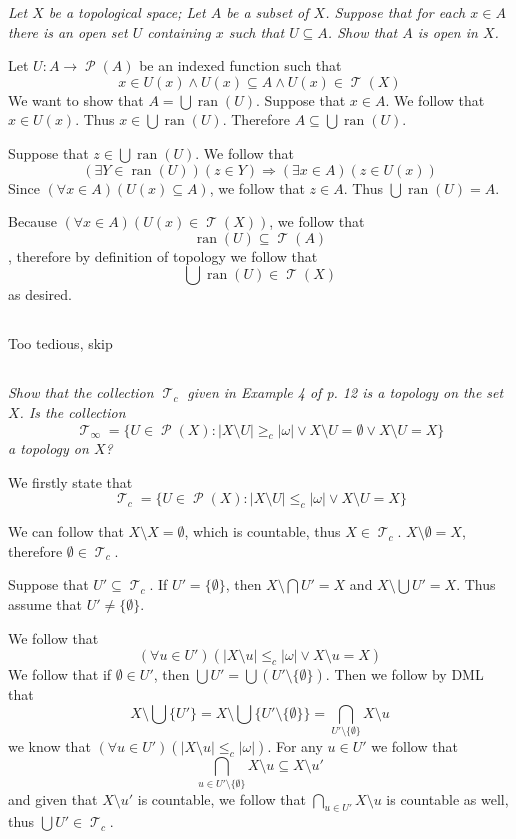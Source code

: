 \documentclass[11pt,oneside,titlepage]{book}
\DeclareMathOperator \pow {\mathcal {P}}
\DeclareMathOperator \topol {\mathcal {T}}
\DeclareMathOperator \ra {\Rightarrow}
\DeclareMathOperator \ran {ran}
\begin{document}
\textit{Let $X$ be a topological space; Let $A$ be a subset of $X$. Suppose that for each
  $x \in A$ there is an open set $U$ containing $x$ such that $U \subseteq A$. Show that $A$ is
  open in $X$.}

Let $U: A \to \pow(A)$ be an indexed function such that 
$$x \in U(x) \land U(x) \subseteq A \land U(x) \in \topol(X)$$
We want to show that $A = \bigcup{\ran(U)}$. Suppose that $x \in A$. We follow that
$x \in U(x)$. Thus $x \in \bigcup{\ran(U)}$. Therefore $A \subseteq \bigcup{\ran(U)}$.

Suppose that $z \in \bigcup{\ran(U)}$. We follow that
$$(\exists Y \in \ran(U))(z \in Y) \ra
(\exists x \in A)(z \in U(x))$$
Since $(\forall x \in A)(U(x) \subseteq A)$, we follow that $z \in A$. Thus
$\bigcup{\ran(U)} = A$.

Because $(\forall x \in A)(U(x) \in \topol(X))$, we follow that
$$\ran(U) \subseteq \topol(A)$$, therefore by definition of topology we follow that
$$\bigcup{\ran(U)} \in \topol(X)$$
as desired.

\subsection{}

Too tedious, skip

\subsection{}

\textit{Show that the collection $\topol_c$ given in Example 4 of p. 12 is a topology on the
  set $X$. Is the collection
  $$\topol_\infty = \{U \in \pow(X):
  |X \setminus U| \geq_c |\omega| \lor X \setminus U = \emptyset \lor
  X \setminus U = X\}$$
  a topology on $X$?
}

We firstly state that
$$\topol_c = \{U \in \pow(X): |X \setminus U| \leq_c |\omega| \lor X \setminus U = X\}$$

We can follow that $X \setminus X = \emptyset$, which is countable, thus $X \in \topol_c$.
$X \setminus \emptyset = X$, therefore $\emptyset \in \topol_c$.

Suppose that $U' \subseteq \topol_c$. If $U' = \{\emptyset\}$, then $
X \setminus \bigcap{U'} = X$ and $X \setminus \bigcup{U'} = X$.
Thus assume that $U' \neq \{\emptyset\}$.

We follow that
$$(\forall u \in U')(|X \setminus u| \leq_c |\omega| \lor X \setminus u = X)$$
We follow that if $\emptyset \in U'$, then $\bigcup{U'} = \bigcup{(U' \setminus \{\emptyset\})}$.
Then we follow by DML that
$$X \setminus \bigcup\{U'\} = X \setminus \bigcup\{U' \setminus \{\emptyset\}\} =
\bigcap_{U' \setminus \{\emptyset\}}{X \setminus u}$$
we know that $(\forall u \in U')(|X \setminus u| \leq_c |\omega|)$. For any $u \in U'$ we
follow that
$$\bigcap_{u \in U' \setminus \{\emptyset\}}{X \setminus u} \subseteq X \setminus u'$$
and given that $X \setminus u'$ is countable, we follow that $\bigcap_{u \in U'}{X \setminus u}$
is countable as well, thus $\bigcup{U'} \in \topol_c$.
\end{document}
